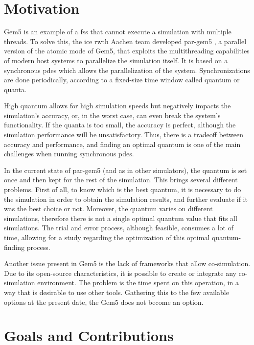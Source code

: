 \section{Motivation}

Gem5 is an example of a \gls{fss} that cannot execute a simulation with multiple threads. To solve this, the \gls{ice} \gls{rwth} Aachen team developed 
par-gem5 \cite{pargem5}, a parallel version of the atomic mode of Gem5, that exploits the multithreading capabilities of modern host systems 
to parallelize the simulation itself. 
It is based on a synchronous \gls{pdes} which allows the parallelization of the system. Synchronizations are done periodically, according to a 
fixed-size time window called quantum or quanta.

High quantum allows for high simulation speeds but negatively impacts the simulation's accuracy, or, in the worst case, can even break the system's 
functionality. If the quanta is too small, the accuracy is perfect, although the simulation performance will be unsatisfactory. Thus, there is a 
tradeoff between accuracy and performance, and finding an optimal quantum is one of the main challenges when running synchronous \gls{pdes}.

In the current state of par-gem5 (and as in other simulators), the quantum is set once and then kept for the rest of the simulation. This brings 
several different problems. First of all, to know which is the best quantum, it is necessary to do the simulation in order to obtain the simulation 
results, and further evaluate if it was the best choice or not. Moreover, the quantum varies on different simulations, therefore there is not a 
single optimal quantum value that fits all simulations. The trial and error process, although feasible, consumes a lot of time, allowing for a 
study regarding the optimization of this optimal quantum-finding process. 

Another issue present in Gem5 is the lack of frameworks that allow co-simulation. Due to its open-source characteristics, it is possible to 
create or integrate any co-simulation environment. The problem is the time spent on this operation, in a way that is desirable to use other 
tools. Gathering this to the few available options at the present date, the Gem5 does not become an option.

\section{Goals and Contributions}

